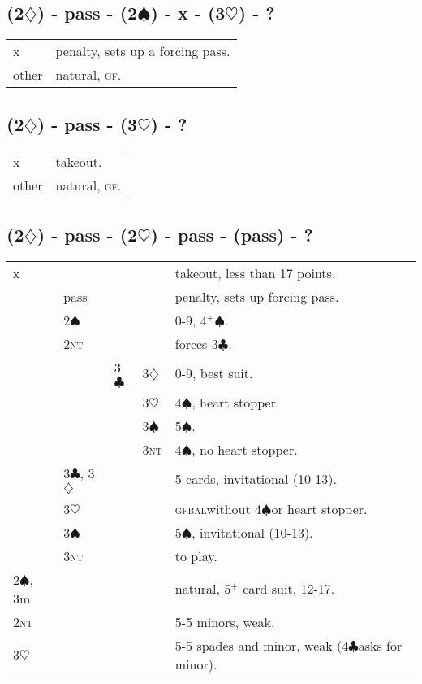 \documentclass{article}
\newcommand{\bal}{\textsc{bal}}
\newcommand{\gf}{\textsc{gf}}
\renewcommand{\c}{\ensuremath{\clubsuit}}
\renewcommand{\d}{\ensuremath{\diamondsuit}}
\newcommand{\h}{\ensuremath{\heartsuit}}
\newcommand{\s}{\ensuremath{\spadesuit}}
\newcommand{\nt}{\textsc{nt}}
\newcommand{\+}{\ensuremath{^+}}
\begin{document}
\subsection{(2\d) - pass - (2\s) - x - (3\h) - ?}
\begin{tabular}{ll}
x & penalty, sets up a forcing pass.\\
other & natural, \gf.\\
\end{tabular}

\subsection{(2\d) - pass - (3\h) - ?}
\begin{tabular}{ll}
x & takeout.\\
other & natural, \gf.\\
\end{tabular}

\subsection{(2\d) - pass - (2\h) - pass - (pass) - ?}
\begin{tabular}{lllll}
x &&&& takeout, less than 17 points.\\
& pass &&& penalty, sets up forcing pass.\\
& 2\s &&& 0-9, 4\+\s.\\
& 2\nt &&& forces 3\c.\\
&& 3\c & 3\d & 0-9, best suit.\\
&&& 3\h & 4\s, heart stopper.\\
&&& 3\s & 5\s.\\
&&& 3\nt & 4\s, no heart stopper.\\
& 3\c, 3\d &&& 5 cards, invitational (10-13). \\
& 3\h &&& \gf \bal without 4\s or heart stopper.\\
& 3\s &&& 5\s, invitational (10-13).\\
& 3\nt &&& to play.\\
2\s, 3m &&&& natural, 5\+ card suit, 12-17.\\
2\nt &&&& 5-5 minors, weak.\\
3\h &&&& 5-5 spades and minor, weak (4\c asks for minor).\\
\end{tabular}
\end{document}
